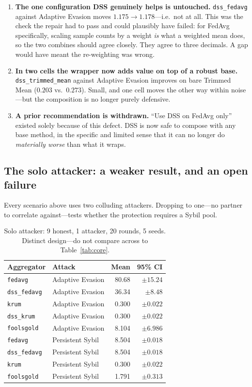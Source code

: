 \documentclass[11pt,a4paper]{article}
\newcommand{\code}[1]{\texttt{\small #1}}
\newcommand{\bad}[1]{\textcolor{red!70!black}{#1}}
\begin{document}
\begin{enumerate}
  \item \textbf{The one configuration DSS genuinely helps is untouched.}
    \code{dss\_fedavg} against Adaptive Evasion moves
    $1.175 \rightarrow 1.178$---i.e.\ not at all. This was the check the
    repair had to pass and could plausibly have failed: for FedAvg
    specifically, scaling sample counts by a weight \emph{is} what a
    weighted mean does, so the two combines should agree closely. They
    agree to three decimals. A gap would have meant the re-weighting was
    wrong.
  \item \textbf{In two cells the wrapper now adds value on top of a robust
    base.} \code{dss\_trimmed\_mean} against Adaptive Evasion improves on
    bare Trimmed Mean ($0.203$ vs.\ $0.273$). Small, and one cell moves
    the other way within noise---but the composition is no longer purely
    defensive.
  \item \textbf{A prior recommendation is withdrawn.} ``Use DSS on FedAvg
    only'' existed solely because of this defect. DSS is now safe to
    compose with any base method, in the specific and limited sense that
    it can no longer do \emph{materially worse} than what it wraps.
\end{enumerate}

\subsection{The solo attacker: a weaker result, and an open failure}
\label{sec:solo}

Every scenario above uses two colluding attackers. Dropping to one---no
partner to correlate against---tests whether the protection requires a
Sybil pool.

\begin{table}[htbp]
\centering
\small
\caption{Solo attacker: 9 honest, 1 attacker, 20 rounds, 5 seeds. Distinct
design---do not compare across to Table~\ref{tab:core}.}
\label{tab:solo}
\begin{tabular}{llrr}
\toprule
\textbf{Aggregator} & \textbf{Attack} & \textbf{Mean} & \textbf{95\% CI} \\
\midrule
\code{fedavg}      & Adaptive Evasion & 80.68 & $\pm 15.24$ \\
\code{dss\_fedavg} & Adaptive Evasion & \bad{36.34} & $\pm 8.48$ \\
\code{krum}        & Adaptive Evasion & 0.300 & $\pm 0.022$ \\
\code{dss\_krum}   & Adaptive Evasion & 0.300 & $\pm 0.022$ \\
\code{foolsgold}   & Adaptive Evasion & 8.104 & $\pm 6.986$ \\
\midrule
\code{fedavg}      & Persistent Sybil & 8.504 & $\pm 0.018$ \\
\code{dss\_fedavg} & Persistent Sybil & 8.504 & $\pm 0.018$ \\
\code{krum}        & Persistent Sybil & 0.300 & $\pm 0.022$ \\
\code{foolsgold}   & Persistent Sybil & 1.791 & $\pm 0.313$ \\
\bottomrule
\end{tabular}
\end{table}
\end{document}
